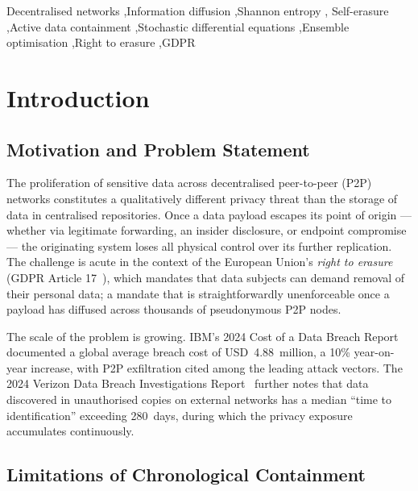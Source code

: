 \documentclass[review,12pt]{elsarticle}
\begin{document}
\begin{frontmatter}
\begin{keyword}
Decentralised networks \sep Information diffusion \sep Shannon entropy \sep
Self-erasure \sep Active data containment \sep Stochastic differential equations
\sep Ensemble optimisation \sep Right to erasure \sep GDPR
\end{keyword}

\end{frontmatter}

\section{Introduction}
\label{sec:intro}

\subsection{Motivation and Problem Statement}

The proliferation of sensitive data across decentralised peer-to-peer (P2P)
networks constitutes a qualitatively different privacy threat than the storage
of data in centralised repositories. Once a data payload escapes its point of
origin --- whether via legitimate forwarding, an insider disclosure, or
endpoint compromise --- the originating system loses all physical control over
its further replication. The challenge is acute in the context of the European
Union's \emph{right to erasure} (GDPR Article 17~\cite{gdpr2016}), which mandates
that data subjects can demand removal of their personal data; a mandate that is
straightforwardly unenforceable once a payload has diffused across thousands
of pseudonymous P2P nodes.

The scale of the problem is growing. IBM's 2024 Cost of a Data Breach
Report~\cite{ibm2024breach} documented a global average breach cost of
USD~4.88~million, a 10\% year-on-year increase, with P2P exfiltration cited
among the leading attack vectors. The 2024 Verizon Data Breach Investigations
Report~\cite{verizon2024dbir} further notes that data discovered in unauthorised
copies on external networks has a median ``time to identification'' exceeding
280~days, during which the privacy exposure accumulates continuously.

\subsection{Limitations of Chronological Containment}
\end{document}
